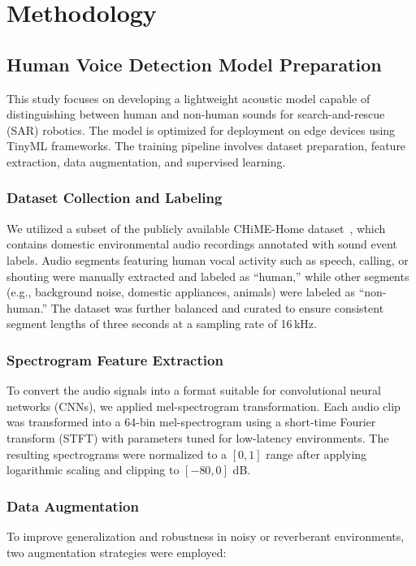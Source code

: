 \section{Methodology}

\subsection{Human Voice Detection Model Preparation}
This study focuses on developing a lightweight acoustic model capable of distinguishing between human and non-human sounds for search-and-rescue (SAR) robotics. The model is optimized for deployment on edge devices using TinyML frameworks. The training pipeline involves dataset preparation, feature extraction, data augmentation, and supervised learning.

\subsubsection{Dataset Collection and Labeling}
We utilized a subset of the publicly available CHiME-Home dataset~\cite{Foster2015chime}, which contains domestic environmental audio recordings annotated with sound event labels. Audio segments featuring human vocal activity such as speech, calling, or shouting were manually extracted and labeled as “human,” while other segments (e.g., background noise, domestic appliances, animals) were labeled as “non-human.” The dataset was further balanced and curated to ensure consistent segment lengths of three seconds at a sampling rate of 16\,kHz.

\subsubsection{Spectrogram Feature Extraction}
To convert the audio signals into a format suitable for convolutional neural networks (CNNs), we applied mel-spectrogram transformation. Each audio clip was transformed into a 64-bin mel-spectrogram using a short-time Fourier transform (STFT) with parameters tuned for low-latency environments. The resulting spectrograms were normalized to a \([0, 1]\) range after applying logarithmic scaling and clipping to \([-80, 0]\) dB.

\subsubsection{Data Augmentation}
To improve generalization and robustness in noisy or reverberant environments, two augmentation strategies were employed:

